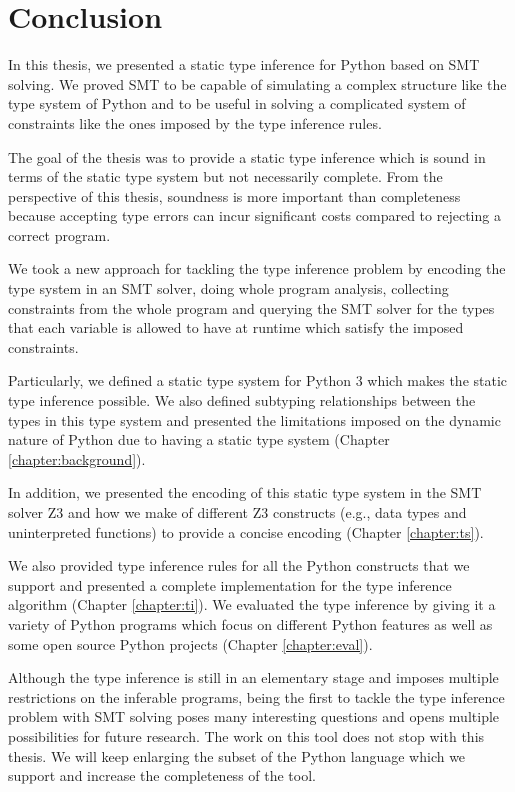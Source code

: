 
\chapter{Conclusion}\label{chapter:conc}
In this thesis, we presented a static type inference for Python based on SMT solving. We proved SMT to be capable of simulating a complex structure like the type system of Python and to be useful in solving a complicated system of constraints like the ones imposed by the type inference rules.

The goal of the thesis was to provide a static type inference which is sound in terms of the static type system but not necessarily complete. From the perspective of this thesis, soundness is more important than completeness because accepting type errors can incur significant costs compared to rejecting a correct program.

We took a new approach for tackling the type inference problem by encoding the type system in an SMT solver, doing whole program analysis, collecting constraints from the whole program and querying the SMT solver for the types that each variable is allowed to have at runtime which satisfy the imposed constraints.

Particularly, we defined a static type system for Python 3 which makes the static type inference possible. We also defined subtyping relationships between the types in this type system and presented the limitations imposed on the dynamic nature of Python due to having a static type system (Chapter \ref{chapter:background}).

In addition, we presented the encoding of this static type system in the SMT solver Z3 and how we make of different Z3 constructs (e.g., data types and uninterpreted functions) to provide a concise encoding (Chapter \ref{chapter:ts}).

We also provided type inference rules for all the Python constructs that we support and presented a complete implementation for the type inference algorithm (Chapter \ref{chapter:ti}). We evaluated the type inference by giving it a variety of Python programs which focus on different Python features as well as some open source Python projects (Chapter \ref{chapter:eval}).

Although the type inference is still in an elementary stage and imposes multiple restrictions on the inferable programs, being the first to tackle the type inference problem with SMT solving poses many interesting questions and opens multiple possibilities for future research. The work on this tool does not stop with this thesis. We will keep enlarging the subset of the Python language which we support and increase the completeness of the tool.